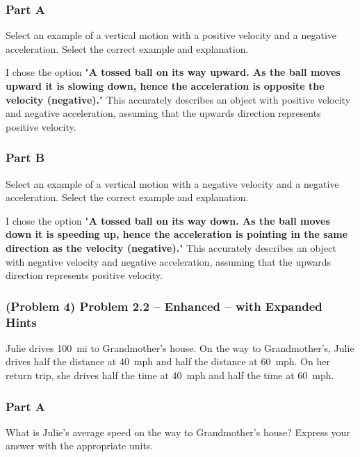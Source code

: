 \subsubsection{Part A}
Select an example of a vertical motion with a positive velocity and a negative acceleration. Select the correct example and explanation.

\begin{solution}
	I chose the option "\textbf{A tossed ball on its way upward. As the ball moves upward it is slowing down, hence the acceleration is opposite the velocity (negative).}" This accurately describes an object with positive velocity and negative acceleration, assuming that the upwards direction represents positive velocity.
\end{solution}

\subsubsection{Part B}
Select an example of a vertical motion with a negative velocity and a negative acceleration. Select the correct example and explanation.

\begin{solution}
	I chose the option "\textbf{A tossed ball on its way down. As the ball moves down it is speeding up, hence the acceleration is pointing in the same direction as the velocity (negative).}" This accurately describes an object with negative velocity and negative acceleration, assuming that the upwards direction represents positive velocity.
\end{solution}

\newpage

\subsubsection{(Problem 4) Problem 2.2 -- Enhanced -- with Expanded Hints}
Julie drives \SI{100}{mi} to Grandmother's house. On the way to Grandmother's, Julie drives half the distance at \SI{40}{mph} and half the distance at \SI{60}{mph}. On her return trip, she drives half the time at \SI{40}{mph} and half the time at \SI{60}{mph}.

\subsubsection{Part A}
What is Julie's average speed on the way to Grandmother's house?
Express your answer with the appropriate units.


